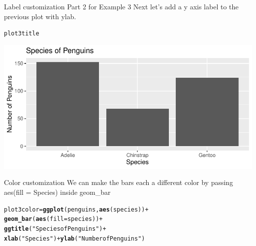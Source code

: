 \documentclass{beamer}\usepackage[]{graphicx}\usepackage[]{xcolor}
\makeatletter
\newcommand{\hlstr}[1]{\textcolor[rgb]{0.192,0.494,0.8}{#1}}%
\newcommand{\hlopt}[1]{\textcolor[rgb]{0,0,0}{#1}}%
\newcommand{\hlstd}[1]{\textcolor[rgb]{0.345,0.345,0.345}{#1}}%
\newcommand{\hlkwb}[1]{\textcolor[rgb]{0.69,0.353,0.396}{#1}}%
\newcommand{\hlkwc}[1]{\textcolor[rgb]{0.333,0.667,0.333}{#1}}%
\newcommand{\hlkwd}[1]{\textcolor[rgb]{0.737,0.353,0.396}{\textbf{#1}}}%
\newenvironment{kframe}{%
 \def\at@end@of@kframe{}%
 \ifinner\ifhmode%
  \def\at@end@of@kframe{\end{minipage}}%
  \begin{minipage}{\columnwidth}%
 \fi\fi%
 \def\FrameCommand##1{\hskip\@totalleftmargin \hskip-\fboxsep
 \colorbox{shadecolor}{##1}\hskip-\fboxsep
     \hskip-\linewidth \hskip-\@totalleftmargin \hskip\columnwidth}%
 \MakeFramed {\advance\hsize-\width
   \@totalleftmargin\z@ \linewidth\hsize
   \@setminipage}}%
 {\par\unskip\endMakeFramed%
 \at@end@of@kframe}
\newenvironment{knitrout}{}{} %
\makeatother
\begin{document}
\begin{frame}[fragile]{Label customization Part 2 for Example 3}
Next let's add a y axis label to the previous plot with ylab.
\begin{knitrout}
\color{fgcolor}\begin{kframe}
\begin{alltt}
\hlstd{plot3title}
\end{alltt}
\end{kframe}
\includegraphics[width=0.95\linewidth]{figure/unnamed-chunk-15-1} 
\end{knitrout}
\end{frame}
\begin{frame}[fragile]{Color customization}
We can make the bars each a different color by passing aes(fill = Species) inside geom\_bar
\begin{knitrout}
\color{fgcolor}\begin{kframe}
\begin{alltt}
\hlstd{plot3color} \hlkwb{=} \hlkwd{ggplot}\hlstd{(penguins,} \hlkwd{aes}\hlstd{(species))} \hlopt{+}
    \hlkwd{geom_bar}\hlstd{(}\hlkwd{aes}\hlstd{(}\hlkwc{fill} \hlstd{= species))} \hlopt{+}
    \hlkwd{ggtitle}\hlstd{(}\hlstr{"Species of Penguins"}\hlstd{)} \hlopt{+}
    \hlkwd{xlab}\hlstd{(}\hlstr{"Species"}\hlstd{)} \hlopt{+} \hlkwd{ylab}\hlstd{(}\hlstr{"Number of Penguins"}\hlstd{)}
\end{alltt}
\end{kframe}
\end{knitrout}
\end{frame}
\end{document}
